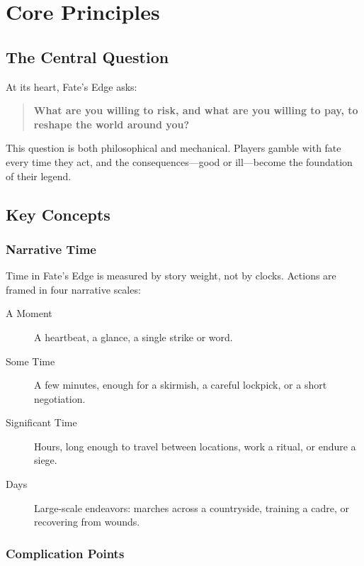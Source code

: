 \chapter{Core Principles}

\section{The Central Question}

At its heart, Fate's Edge asks:
\begin{quote}
\textbf{What are you willing to risk, and what are you willing to pay, to reshape the world around you?}
\end{quote}

This question is both philosophical and mechanical. Players gamble with fate every time they act, and the consequences---good or ill---become the foundation of their legend.

\section{Key Concepts}

\subsection{Narrative Time}

Time in Fate's Edge is measured by story weight, not by clocks. Actions are framed in four narrative scales:

\begin{description}
\item[A Moment] A heartbeat, a glance, a single strike or word.
\item[Some Time] A few minutes, enough for a skirmish, a careful lockpick, or a short negotiation.
\item[Significant Time] Hours, long enough to travel between locations, work a ritual, or endure a siege.
\item[Days] Large-scale endeavors: marches across a countryside, training a cadre, or recovering from wounds.
\end{description}

\subsection{Complication Points}

